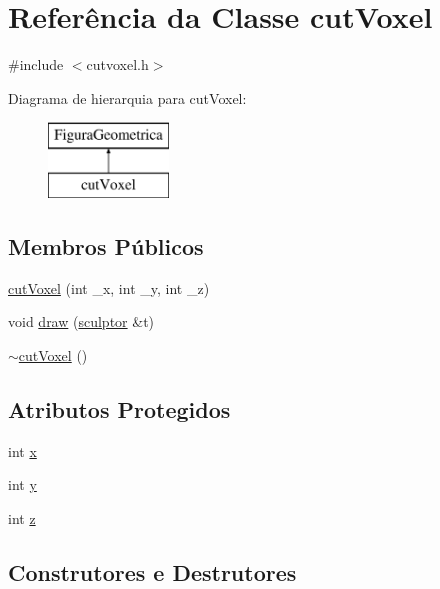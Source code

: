 \hypertarget{classcut_voxel}{}\section{Referência da Classe cut\+Voxel}
\label{classcut_voxel}


{\ttfamily \#include $<$cutvoxel.\+h$>$}

Diagrama de hierarquia para cut\+Voxel\+:\begin{figure}[H]
\begin{center}
\leavevmode
\includegraphics[height=2.000000cm]{classcut_voxel}
\end{center}
\end{figure}
\subsection*{Membros Públicos}
\begin{DoxyCompactItemize}
\item 
\mbox{\hyperlink{classcut_voxel_a2e1224665740458be2630901e14068e0}{cut\+Voxel}} (int \+\_\+x, int \+\_\+y, int \+\_\+z)
\item 
void \mbox{\hyperlink{classcut_voxel_a5597800b2270f51a9526ba9b3f751101}{draw}} (\mbox{\hyperlink{classsculptor}{sculptor}} \&t)
\item 
\mbox{\hyperlink{classcut_voxel_a7bcbee6a6842c7b359980f5d6fe29921}{$\sim$cut\+Voxel}} ()
\end{DoxyCompactItemize}
\subsection*{Atributos Protegidos}
\begin{DoxyCompactItemize}
\item 
int \mbox{\hyperlink{classcut_voxel_a7263db80615d39e889bc69464b1b2293}{x}}
\item 
int \mbox{\hyperlink{classcut_voxel_a4b616e13ab0bc139e428e22d0d801345}{y}}
\item 
int \mbox{\hyperlink{classcut_voxel_aa9cf73614edaa446f3cba592c4c4f4c1}{z}}
\end{DoxyCompactItemize}


\subsection{Construtores e Destrutores}
\mbox{\label{classcut_voxel_a2e1224665740458be2630901e14068e0}} 
